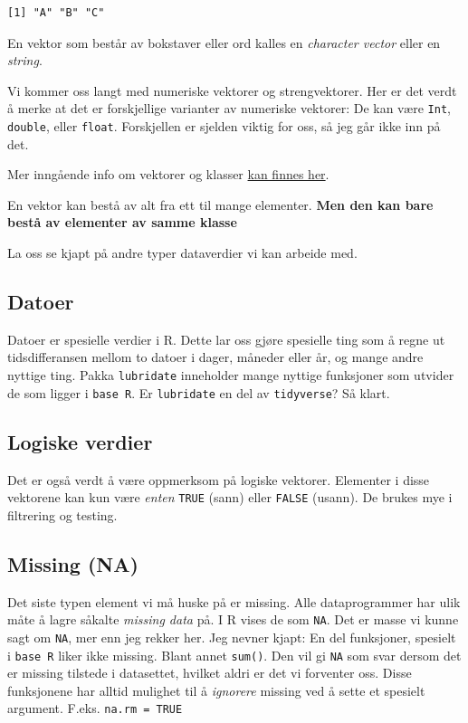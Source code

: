 \documentclass[
  letterpaper,
  DIV=11,
  numbers=noendperiod]{scrreprt}
\begin{document}
\begin{verbatim}
[1] "A" "B" "C"
\end{verbatim}

En vektor som består av bokstaver eller ord kalles en \emph{character
vector} eller en \emph{string}.

Vi kommer oss langt med numeriske vektorer og strengvektorer. Her er det
verdt å merke at det er forskjellige varianter av numeriske vektorer: De
kan være \texttt{Int}, \texttt{double}, eller \texttt{float}.
Forskjellen er sjelden viktig for oss, så jeg går ikke inn på det.

Mer inngående info om vektorer og klasser
\href{https://r02pro.github.io/vector.html}{kan finnes her}.

En vektor kan bestå av alt fra ett til mange elementer. \textbf{Men den
kan bare bestå av elementer av samme klasse}

La oss se kjapt på andre typer dataverdier vi kan arbeide med.

\hypertarget{datoer}{%
\subsection{Datoer}\label{datoer}}

Datoer er spesielle verdier i R. Dette lar oss gjøre spesielle ting som
å regne ut tidsdifferansen mellom to datoer i dager, måneder eller år,
og mange andre nyttige ting. Pakka \texttt{lubridate} inneholder mange
nyttige funksjoner som utvider de som ligger i \texttt{base\ R}. Er
\texttt{lubridate} en del av \texttt{tidyverse}? Så klart.

\hypertarget{logiske-verdier}{%
\subsection{Logiske verdier}\label{logiske-verdier}}

Det er også verdt å være oppmerksom på logiske vektorer. Elementer i
disse vektorene kan kun være \emph{enten} \texttt{TRUE} (sann) eller
\texttt{FALSE} (usann). De brukes mye i filtrering og testing.

\hypertarget{missing-na}{%
\subsection{Missing (NA)}\label{missing-na}}

Det siste typen element vi må huske på er missing. Alle dataprogrammer
har ulik måte å lagre såkalte \emph{missing data} på. I R vises de som
\texttt{NA}. Det er masse vi kunne sagt om \texttt{NA}, mer enn jeg
rekker her. Jeg nevner kjapt: En del funksjoner, spesielt i
\texttt{base\ R} liker ikke missing. Blant annet \texttt{sum()}. Den vil
gi \texttt{NA} som svar dersom det er missing tilstede i datasettet,
hvilket aldri er det vi forventer oss. Disse funksjonene har alltid
mulighet til å \emph{ignorere} missing ved å sette et spesielt argument.
F.eks. \texttt{na.rm\ =\ TRUE}
\end{document}
